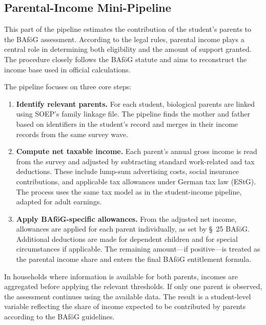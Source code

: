 \subsection{Parental-Income Mini-Pipeline}

This part of the pipeline estimates the contribution of the student's parents to the BAföG assessment. According to the legal rules, parental income plays a central role in determining both eligibility and the amount of support granted. The procedure closely follows the BAföG statute and aims to reconstruct the income base used in official calculations.

\medskip
\noindent
The pipeline focuses on three core steps:

\begin{enumerate}
  \item \textbf{Identify relevant parents.}  
  For each student, biological parents are linked using SOEP’s family linkage file. The pipeline finds the mother and father based on identifiers in the student’s record and merges in their income records from the same survey wave.

  \item \textbf{Compute net taxable income.}  
  Each parent's annual gross income is read from the survey and adjusted by subtracting standard work-related and tax deductions. These include lump-sum advertising costs, social insurance contributions, and applicable tax allowances under German tax law (EStG). The process uses the same tax model as in the student-income pipeline, adapted for adult earnings.

  \item \textbf{Apply BAföG-specific allowances.}  
  From the adjusted net income, allowances are applied for each parent individually, as set by §~25 BAföG. Additional deductions are made for dependent children and for special circumstances if applicable. The remaining amount—if positive—is treated as the parental income share and enters the final BAföG entitlement formula.
\end{enumerate}

\medskip
\noindent
In households where information is available for both parents, incomes are aggregated before applying the relevant thresholds. If only one parent is observed, the assessment continues using the available data. The result is a student-level variable reflecting the share of income expected to be contributed by parents according to the BAföG guidelines.

